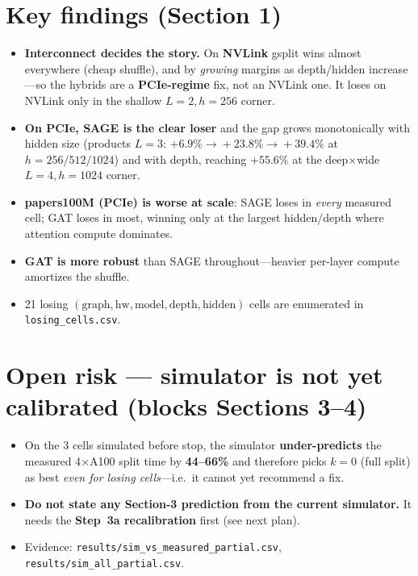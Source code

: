\section*{Key findings (Section 1)}
\begin{itemize}
\item \textbf{Interconnect decides the story.} On \textbf{NVLink} gsplit wins almost
everywhere (cheap shuffle), and by \emph{growing} margins as depth/hidden increase---so
the hybrids are a \textbf{PCIe-regime} fix, not an NVLink one. It loses on NVLink only in
the shallow $L{=}2,h{=}256$ corner.
\item \textbf{On PCIe, SAGE is the clear loser} and the gap grows monotonically with
hidden size (products $L{=}3$: $+6.9\%\!\to\!+23.8\%\!\to\!+39.4\%$ at $h{=}256/512/1024$)
and with depth, reaching $\mathbf{+55.6\%}$ at the deep$\times$wide $L{=}4,h{=}1024$ corner.
\item \textbf{papers100M (PCIe) is worse at scale}: SAGE loses in \emph{every} measured
cell; GAT loses in most, winning only at the largest hidden/depth where attention compute
dominates.
\item \textbf{GAT is more robust} than SAGE throughout---heavier per-layer compute
amortizes the shuffle.
\item 21 losing $(\textrm{graph},\textrm{hw},\textrm{model},\textrm{depth},\textrm{hidden})$
cells are enumerated in \texttt{losing\_cells.csv}.
\end{itemize}

\section*{Open risk --- simulator is not yet calibrated (blocks Sections 3--4)}
\begin{itemize}
\item On the 3 cells simulated before stop, the simulator \textbf{under-predicts} the
measured 4$\times$A100 split time by \textbf{44--66\%} and therefore picks $k{=}0$ (full
split) as best \emph{even for losing cells}---i.e.\ it cannot yet recommend a fix.
\item \textbf{Do not state any Section-3 prediction from the current simulator.} It needs
the \textbf{Step~3a recalibration} first (see next plan).
\item Evidence: \texttt{results/sim\_vs\_measured\_partial.csv},
\texttt{results/sim\_all\_partial.csv}.
\end{itemize}


